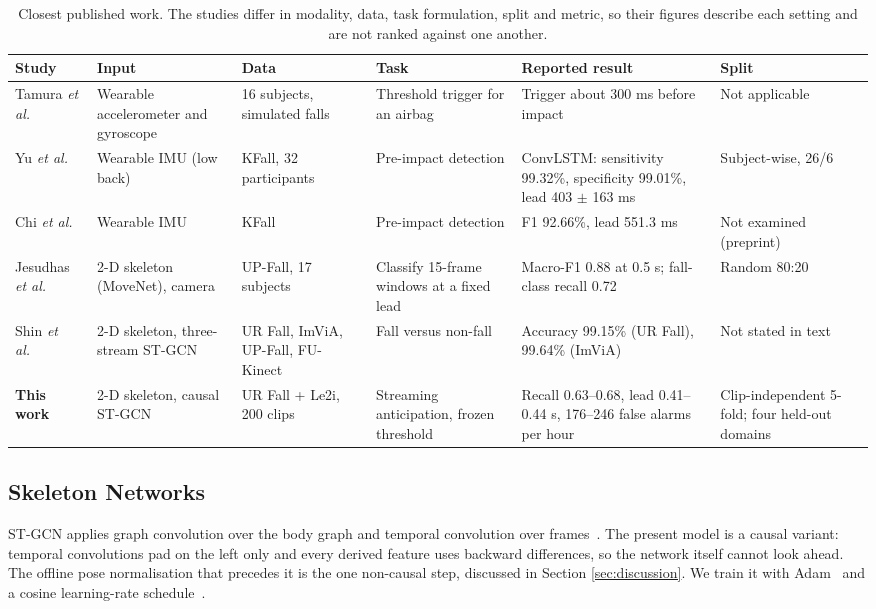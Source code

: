 \documentclass[journal]{IEEEtran}
\begin{document}
\begin{table}[!t]
\renewcommand{\arraystretch}{1.15}
\caption{Closest published work. The studies differ in modality, data, task formulation, split and metric, so their figures describe each setting and are not ranked against one another.}
\label{tab:related}
\centering
\footnotesize
\begin{tabular}{p{}p{}p{}p{}p{}p{}}
\hline
Study & Input & Data & Task & Reported result & Split \\
\hline
Tamura \textit{et al.}~\cite{tamura} & Wearable accelerometer and gyroscope & 16 subjects, simulated falls & Threshold trigger for an airbag & Trigger about 300 ms before impact & Not applicable \\
Yu \textit{et al.}~\cite{kfall} & Wearable IMU (low back) & KFall, 32 participants & Pre-impact detection & ConvLSTM: sensitivity 99.32\%, specificity 99.01\%, lead 403 $\pm$ 163 ms & Subject-wise, 26/6 \\
Chi \textit{et al.}~\cite{prefallkd} & Wearable IMU & KFall & Pre-impact detection & F1 92.66\%, lead 551.3 ms & Not examined (preprint) \\
Jesudhas \textit{et al.}~\cite{jesudhas} & 2-D skeleton (MoveNet), camera & UP-Fall, 17 subjects & Classify 15-frame windows at a fixed lead & Macro-F1 0.88 at 0.5 s; fall-class recall 0.72 & Random 80:20 \\
Shin \textit{et al.}~\cite{shin} & 2-D skeleton, three-stream ST-GCN & UR Fall, ImViA, UP-Fall, FU-Kinect & Fall versus non-fall & Accuracy 99.15\% (UR Fall), 99.64\% (ImViA) & Not stated in text \\
\textbf{This work} & 2-D skeleton, causal ST-GCN & UR Fall + Le2i, 200 clips & Streaming anticipation, frozen threshold & Recall 0.63--0.68, lead 0.41--0.44 s, 176--246 false alarms per hour & Clip-independent 5-fold; four held-out domains \\
\hline
\end{tabular}
\end{table}


\subsection{Skeleton Networks}\label{sub:stgcn}

ST-GCN applies graph convolution over the body graph and temporal convolution over frames~\cite{stgcn}. The present model is a causal variant: temporal convolutions pad on the left only and every derived feature uses backward differences, so the network itself cannot look ahead. The offline pose normalisation that precedes it is the one non-causal step, discussed in Section \ref{sec:discussion}. We train it with Adam~\cite{adam} and a cosine learning-rate schedule~\cite{sgdr}.
\end{document}
